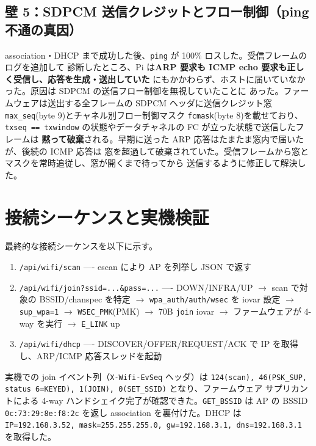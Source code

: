 \documentclass[a4paper,11pt]{ltjsarticle}
\begin{document}
\subsection{壁 5：SDPCM 送信クレジットとフロー制御（ping 不通の真因）}
association・DHCP まで成功した後、\texttt{ping} が 100\% ロスした。受信フレームのログを追加して
診断したところ、Pi は\textbf{ARP 要求も ICMP echo 要求も正しく受信し、応答を生成・送出していた}
にもかかわらず、ホストに届いていなかった。原因は SDPCM の送信フロー制御を無視していたことに
あった。ファームウェアは送出する全フレームの SDPCM ヘッダに送信クレジット窓
\texttt{max\_seq}(byte 9)とチャネル別フロー制御マスク \texttt{fcmask}(byte 8)を載せており、
\texttt{txseq == txwindow} の状態やデータチャネルの FC が立った状態で送信したフレームは
\textbf{黙って破棄}される。早期に送った ARP 応答はたまたま窓内で届いたが、後続の ICMP 応答は
窓を超過して破棄されていた。受信フレームから窓とマスクを常時追従し、窓が開くまで待ってから
送信するように修正して解決した。

\section{接続シーケンスと実機検証}
最終的な接続シーケンスを以下に示す。
\begin{enumerate}
  \item \texttt{/api/wifi/scan} ---- escan により AP を列挙し JSON で返す
  \item \texttt{/api/wifi/join?ssid=...\&pass=...} ---- DOWN/INFRA/UP $\to$ scan で対象の BSSID/chanspec を特定
        $\to$ \texttt{wpa\_auth/auth/wsec} を iovar 設定 $\to$ \texttt{sup\_wpa=1} $\to$ \texttt{WSEC\_PMK}(PMK)
        $\to$ 70B \texttt{join} iovar $\to$ ファームウェアが 4-way を実行 $\to$ \texttt{E\_LINK} up
  \item \texttt{/api/wifi/dhcp} ---- DISCOVER/OFFER/REQUEST/ACK で IP を取得し、ARP/ICMP 応答スレッドを起動
\end{enumerate}

実機での join イベント列（\texttt{X-Wifi-EvSeq} ヘッダ）は
\texttt{124(scan), 46(PSK\_SUP, status 6=KEYED), 1(JOIN), 0(SET\_SSID)} となり、ファームウェア
サプリカントによる 4-way ハンドシェイク完了が確認できた。\texttt{GET\_BSSID} は AP の BSSID
\texttt{0c:73:29:8e:f8:2c} を返し association を裏付けた。DHCP は
\texttt{IP=192.168.3.52, mask=255.255.255.0, gw=192.168.3.1, dns=192.168.3.1} を取得した。
\end{document}
